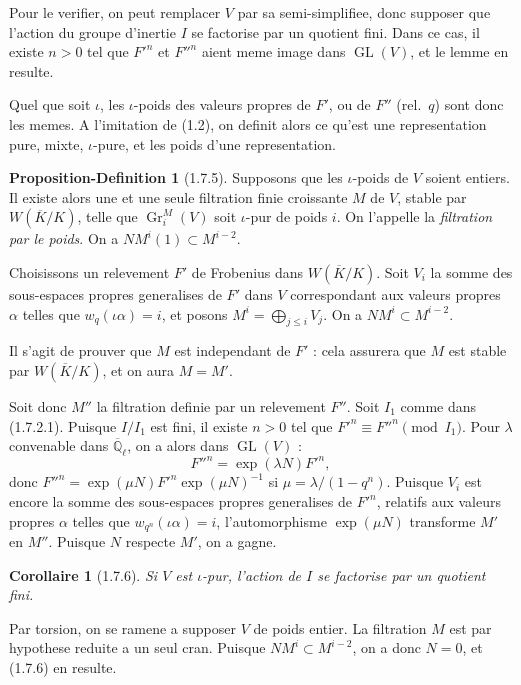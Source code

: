 \documentclass[12pt,a4paper]{article}
\theoremstyle{plain}
\newtheorem{corollaire}[theorem]{Corollaire}
\theoremstyle{definition}
\newtheorem{proposition-definition}[theorem]{Proposition-Definition}
\theoremstyle{definition}
\theoremstyle{remark}
\DeclareMathOperator{\GL}{GL}
\DeclareMathOperator{\Gr}{Gr}
\begin{document}
Pour le verifier, on peut remplacer $V$ par sa semi-simplifiee, donc supposer que l'action du groupe d'inertie $I$ se factorise par un quotient fini. Dans ce cas, il existe $n > 0$ tel que $F'^n$ et $F''^n$ aient meme image dans $\GL(V)$, et le lemme en resulte.

Quel que soit $\iota$, les $\iota$-poids des valeurs propres de $F'$, ou de $F''$ (rel.~$q$) sont donc les memes. A l'imitation de (1.2), on definit alors ce qu'est une representation pure, mixte, $\iota$-pure, et les poids d'une representation.

\begin{proposition-definition}[1.7.5]
Supposons que les $\iota$-poids de $V$ soient entiers. Il existe alors une et une seule filtration finie croissante $M$ de $V$, stable par $W(\overline{K}/K)$, telle que $\Gr_i^M(V)$ soit $\iota$-pur de poids $i$. On l'appelle la \emph{filtration par le poids}. On a $NM^i(1) \subset M^{i-2}$.
\end{proposition-definition}

Choisissons un relevement $F'$ de Frobenius dans $W(\overline{K}/K)$. Soit $V_i$ la somme des sous-espaces propres generalises de $F'$ dans $V$ correspondant aux valeurs propres $\alpha$ telles que $w_q(\iota\alpha) = i$, et posons $M^i = \bigoplus_{j \leq i} V_j$. On a $NM^i \subset M^{i-2}$.

Il s'agit de prouver que $M$ est independant de $F'$ : cela assurera que $M$ est stable par $W(\overline{K}/K)$, et on aura $M = M'$.

Soit donc $M''$ la filtration definie par un relevement $F''$. Soit $I_1$ comme dans (1.7.2.1). Puisque $I/I_1$ est fini, il existe $n > 0$ tel que $F'^n \equiv F''^n \pmod{I_1}$. Pour $\lambda$ convenable dans $\overline{\mathbb{Q}}_\ell$, on a alors dans $\GL(V)$ :
\[F''^n = \exp(\lambda N) F'^n,\]
donc $F''^n = \exp(\mu N) F'^n \exp(\mu N)^{-1}$ si $\mu = \lambda/(1-q^n)$. Puisque $V_i$ est encore la somme des sous-espaces propres generalises de $F'^n$, relatifs aux valeurs propres $\alpha$ telles que $w_{q^n}(\iota\alpha) = i$, l'automorphisme $\exp(\mu N)$ transforme $M'$ en $M''$. Puisque $N$ respecte $M'$, on a gagne.

\begin{corollaire}[1.7.6]
Si $V$ est $\iota$-pur, l'action de $I$ se factorise par un quotient fini.
\end{corollaire}

Par torsion, on se ramene a supposer $V$ de poids entier. La filtration $M$ est par hypothese reduite a un seul cran. Puisque $NM^i \subset M^{i-2}$, on a donc $N = 0$, et (1.7.6) en resulte.
\end{document}
